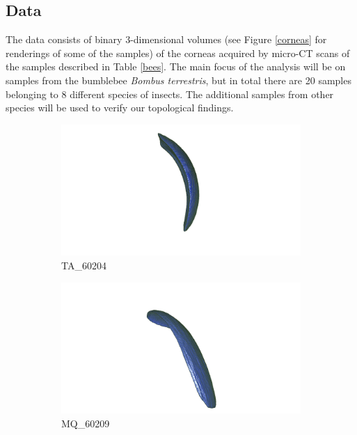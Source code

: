 \subsection{Data}
The data consists of binary 3-dimensional volumes (see Figure \ref{corneas} for renderings of some of the samples) of the corneas acquired by micro-CT scans of the samples described in Table \ref{bees}. The main focus of the analysis will be on samples from the bumblebee \textit{Bombus terrestris}, but in total there are 20 samples belonging to 8 different species of insects. The additional samples from other species will be used to verify our topological findings.
\begin{figure}[h]
  \centering
  \begin{subfigure}{.3 \linewidth}
  \centering
  \includegraphics[scale=0.2]{ta60204_cornea.png}
  \caption{TA\_60204}
  \end{subfigure}%
  \begin{subfigure}{.3 \linewidth}
  \centering
  \includegraphics[scale=0.2]{mq60209_cornea.png}
  \caption{MQ\_60209}
  \end{subfigure}%
  \begin{subfigure}{.3 \linewidth}

\end{subfigure}
\end{figure}
